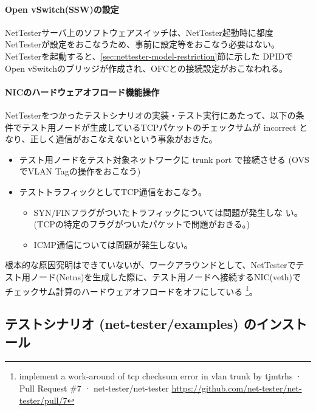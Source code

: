     \paragraph{Open vSwitch(SSW)の設定}
NetTesterサーバ上のソフトウェアスイッチは、NetTester起動時に都度
NetTesterが設定をおこなうため、事前に設定等をおこなう必要はない。
NetTesterを起動すると、\ref{sec:nettester-model-restriction}節に示した
DPIDでOpen vSwitchのブリッジが作成され、OFCとの接続設定がおこなわれる。

    \paragraph{NICのハードウェアオフロード機能操作}
NetTesterをつかったテストシナリオの実装・テスト実行にあたって、以下の条
件でテスト用ノードが生成しているTCPパケットのチェックサムが incorrect と
なり、正しく通信がおこなえないという事象がおきた。
\begin{itemize}
 \item テスト用ノードをテスト対象ネットワークに trunk port で接続させる
       (OVSでVLAN Tagの操作をおこなう)
 \item テストトラフィックとしてTCP通信をおこなう。
       \begin{itemize}
        \item SYN/FINフラグがついたトラフィックについては問題が発生しな
              い。(TCPの特定のフラグがついたパケットで問題がおきる。)
        \item ICMP通信については問題が発生しない。
       \end{itemize}
\end{itemize}

根本的な原因究明はできていないが、ワークアラウンドとして、NetTesterでテ
スト用ノード(Netns)を生成した際に、テスト用ノードへ接続するNIC(veth)で
チェックサム計算のハードウェアオフロードをオフにしている
\footnote{implement a work-around of tcp checksum error in vlan trunk by
tjmtrhs · Pull Request \#7 · net-tester/net-tester
\url{https://github.com/net-tester/net-tester/pull/7}}。

  \subsection{テストシナリオ (net-tester/examples) のインストール}
  \label{sec:deploy-test-cenario}

